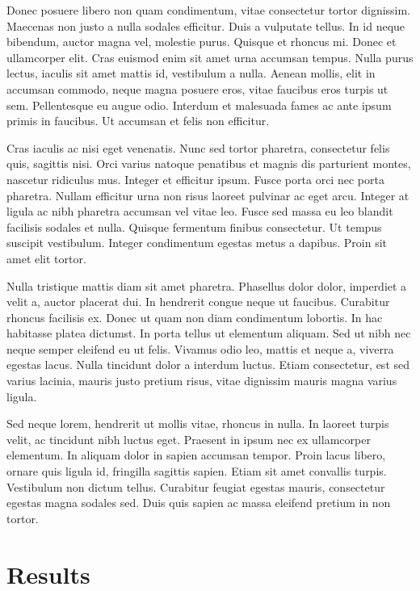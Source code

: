 \documentclass[8pt]{article}
\begin{document}
\begin{multicols}{2}
Donec posuere libero non quam condimentum, vitae consectetur tortor dignissim. Maecenas non justo a nulla sodales efficitur. Duis a vulputate tellus. In id neque bibendum, auctor magna vel, molestie purus. Quisque et rhoncus mi. Donec et ullamcorper elit. Cras euismod enim sit amet urna accumsan tempus. Nulla purus lectus, iaculis sit amet mattis id, vestibulum a nulla. Aenean mollis, elit in accumsan commodo, neque magna posuere eros, vitae faucibus eros turpis ut sem. Pellentesque eu augue odio. Interdum et malesuada fames ac ante ipsum primis in faucibus. Ut accumsan et felis non efficitur.

Cras iaculis ac nisi eget venenatis. Nunc sed tortor pharetra, consectetur felis quis, sagittis nisi. Orci varius natoque penatibus et magnis dis parturient montes, nascetur ridiculus mus. Integer et efficitur ipsum. Fusce porta orci nec porta pharetra. Nullam efficitur urna non risus laoreet pulvinar ac eget arcu. Integer at ligula ac nibh pharetra accumsan vel vitae leo. Fusce sed massa eu leo blandit facilisis sodales et nulla. Quisque fermentum finibus consectetur. Ut tempus suscipit vestibulum. Integer condimentum egestas metus a dapibus. Proin sit amet elit tortor.

Nulla tristique mattis diam sit amet pharetra. Phasellus dolor dolor, imperdiet a velit a, auctor placerat dui. In hendrerit congue neque ut faucibus. Curabitur rhoncus facilisis ex. Donec ut quam non diam condimentum lobortis. In hac habitasse platea dictumst. In porta tellus ut elementum aliquam. Sed ut nibh nec neque semper eleifend eu ut felis. Vivamus odio leo, mattis et neque a, viverra egestas lacus. Nulla tincidunt dolor a interdum luctus. Etiam consectetur, est sed varius lacinia, mauris justo pretium risus, vitae dignissim mauris magna varius ligula.

Sed neque lorem, hendrerit ut mollis vitae, rhoncus in nulla. In laoreet turpis velit, ac tincidunt nibh luctus eget. Praesent in ipsum nec ex ullamcorper elementum. In aliquam dolor in sapien accumsan tempor. Proin lacus libero, ornare quis ligula id, fringilla sagittis sapien. Etiam sit amet convallis turpis. Vestibulum non dictum tellus. Curabitur feugiat egestas mauris, consectetur egestas magna sodales sed. Duis quis sapien ac massa eleifend pretium in non tortor. 

\section{Results}


\end{multicols}
\end{document}
